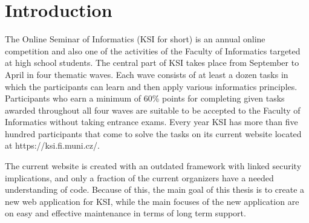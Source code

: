 \documentclass[
  digital, %
  oneside, %
  lof,     %
  lot,     %
]{fithesis4}
\begin{document}
\clearpage
\printnoidxglossary[title={Abbreviations}, type=\acronymtype]
\printnoidxglossary[title={Glossary}]

\chapter*{Introduction}

\mdstart

The Online Seminar of Informatics (KSI for short) is an annual online competition and also one of the activities of the Faculty of Informatics targeted at high school students. The central part of KSI takes place from September to April in four thematic waves. Each wave consists of at least a dozen tasks in which the participants can learn and then apply various informatics principles. Participants who earn a minimum of 60\% points for completing given tasks awarded throughout all four waves are suitable to be accepted to the Faculty of Informatics without taking entrance exams. Every year KSI has more than five hundred participants that come to solve the tasks on its current website located at https://ksi.fi.muni.cz/.

The current website is created with an outdated framework with linked security implications, and only a fraction of the current organizers have a needed understanding of code. Because of this, the main goal of this thesis is to create a new web application for KSI, while the main focuses of the new application are on easy and effective maintenance in terms of long term support.
\end{document}
